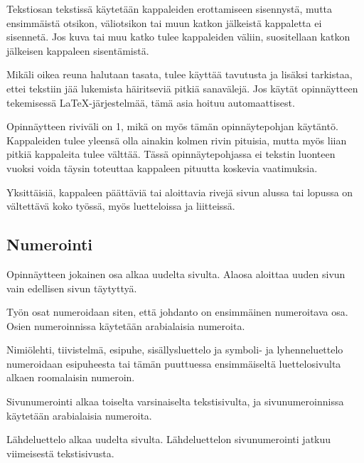 \documentclass[english,12pt,a4paper,pdftex,sci,utf8]{aaltothesis}
\begin{document}
Tekstiosan tekstiss\"a k\"aytet\"a\"an kappaleiden erottamiseen sisennyst\"a,
mutta ensimm\"aist\"a otsikon, v\"aliotsikon tai muun katkon j\"alkeist\"a
kappaletta ei sisennet\"a. Jos kuva tai muu katko tulee kappaleiden
v\"aliin, suositellaan katkon j\"alkeisen kappaleen sisent\"amist\"a.

Mik\"ali oikea reuna halutaan tasata, tulee k\"aytt\"a\"a tavutusta ja lis\"aksi
tarkistaa, ettei tekstiin j\"a\"a lukemista h\"airitsevi\"a pitki\"a sanav\"alej\"a. Jos
k\"ayt\"at opinn\"aytteen tekemisess\"a \LaTeX-j\"arjestelm\"a\"a, 
t\"am\"a asia hoituu automaattisest.

Opinn\"aytteen riviv\"ali on 1, mik\"a on my\"os t\"am\"an opinn\"aytepohjan k\"ayt\"ant\"o. 
Kappaleiden tulee yleens\"a olla ainakin kolmen rivin pituisia, mutta
my\"os liian pitki\"a kappaleita tulee v\"altt\"a\"a.  T\"ass\"a opinn\"aytepohjassa
ei tekstin luonteen vuoksi voida t\"aysin toteuttaa kappaleen pituutta koskevia
vaatimuksia.

Yksitt\"aisi\"a, kappaleen p\"a\"att\"avi\"a tai aloittavia rivej\"a sivun alussa
tai lopussa on v\"altett\"av\"a koko ty\"oss\"a, my\"os luetteloissa ja
liitteiss\"a.

\subsection*{Numerointi}

Opinn\"aytteen jokainen osa alkaa uudelta sivulta. Alaosa aloittaa uuden
sivun vain edellisen sivun t\"aytytty\"a.

Ty\"on osat numeroidaan siten, ett\"a johdanto on ensimm\"ainen numeroitava
osa. Osien numeroinnissa k\"aytet\"a\"an arabialaisia numeroita.

Nimi\"olehti, tiivistelm\"a, esipuhe, sis\"allysluettelo ja symboli- ja
lyhenneluettelo numeroidaan esipuheesta tai t\"am\"an puuttuessa 
ensimm\"aiselt\"a luettelosivulta alkaen roomalaisin numeroin.

Sivunumerointi alkaa toiselta varsinaiselta tekstisivulta, ja 
sivunumeroinnissa k\"aytet\"a\"an arabialaisia numeroita.

L\"ahdeluettelo alkaa uudelta sivulta. L\"ahdeluettelon sivunumerointi 
jatkuu viimeisest\"a tekstisivusta.
\end{document}
